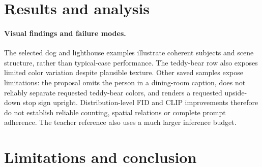 \documentclass[10pt,twocolumn,letterpaper]{article}
\begin{document}
\section{Results and analysis}
\begin{table}[t]
\centering\scriptsize
\resizebox{\linewidth}{!}{}
\caption{Full-validation quality: 5,000 generated images and 5,000 real
references. Student rows use the full 36,000-step budget. Bold marks the best
student value within this comparison. SwiftBrush uses teacher CFG 4.5/FP32 and other students
use CFG 7.5/BF16; the teacher has a longer trajectory. All baseline names refer to
our implementations.}
\label{tab:quality}
\end{table}


\begin{table}[t]
\centering\scriptsize
\resizebox{\linewidth}{!}{}
\caption{Factorial study with a shared initialization and 36,000 total
training steps. Diversity is pairwise LPIPS-Alex distance across four seeds
for each of 128 prompts. Bold marks the lowest ablation FID; a larger
perceptual distance does not itself imply higher quality.}
\label{tab:ablation}
\end{table}



\paragraph{Visual findings and failure modes.}
The selected dog and lighthouse examples illustrate coherent subjects and
scene structure, rather than typical-case performance. The teddy-bear row
also exposes limited color variation despite plausible texture.
Other saved samples expose limitations: the proposal omits the person in a
dining-room caption, does not reliably separate requested teddy-bear colors,
and renders a requested upside-down stop sign upright. Distribution-level
FID and CLIP improvements therefore do not establish reliable counting,
spatial relations or complete prompt adherence. The teacher reference also
uses a much larger inference budget.

\section{Limitations and conclusion}
\end{document}
